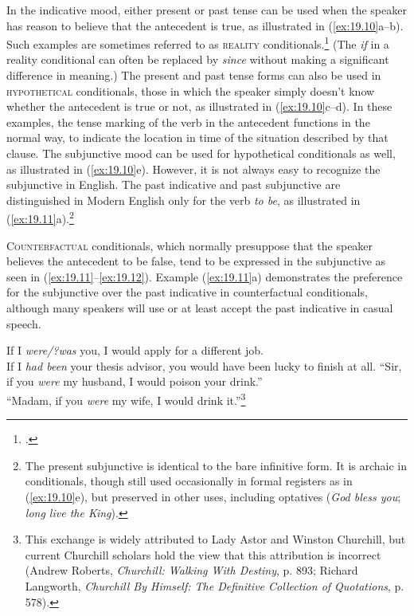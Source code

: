 In the indicative mood, either present or past tense can be used when the speaker has reason to believe that the antecedent is true, as illustrated in (\ref{ex:19.10}a--b). Such examples are sometimes referred to as \textsc{reality} conditionals.\footnote{\citet{ThompsonEtAl2007}.} (The \textit{if} in a reality conditional can often be replaced by \textit{since} without making a significant difference in meaning.) The present and past tense forms can also be used in \textsc{hypothetical} conditionals, those in which the speaker simply doesn’t know whether the antecedent is true or not, as illustrated in (\ref{ex:19.10}c--d). In these examples, the tense marking of the verb in the antecedent functions in the normal way, to indicate the location in time of the situation described by that clause. The subjunctive mood can be used for hypothetical conditionals as well, as illustrated in (\ref{ex:19.10}e). However, it is not always easy to recognize the subjunctive in English. The past indicative and past subjunctive are distinguished in Modern English only for the verb \textit{to be}, as illustrated in (\ref{ex:19.11}a).\footnote{The present subjunctive is identical to the bare infinitive form. It is archaic in conditionals, though still used occasionally in formal registers as in (\ref{ex:19.10}e), but preserved in other uses, including optatives (\textit{God bless you}; \textit{long live the King}).}



\textsc{Counterfactual} conditionals, which normally presuppose that the speaker believes the antecedent to be false, tend to be expressed in the subjunctive as seen in (\ref{ex:19.11}--\ref{ex:19.12}). Example (\ref{ex:19.11}a) demonstrates the preference for the subjunctive over the past indicative in counterfactual conditionals, although many speakers will use or at least accept the past indicative in casual speech.\largerpage[-1.5]


\ea \label{ex:19.11}
\ea  If I \textit{were/?was} you, I would apply for a different job.\\
\ex If I \textit{had been} your thesis advisor, you would have been lucky to finish at all.
\z\pagebreak
\ex \label{ex:19.12}
“Sir, if you \textit{were} my husband, I would poison your drink.”\\
“Madam, if you \textit{were} my wife, I would drink it.”\footnote{This exchange is widely attributed to Lady Astor and Winston Churchill, but current Churchill scholars hold the view that this attribution is incorrect (Andrew Roberts, \textit{Churchill: Walking With Destiny}, p. 893; Richard Langworth, \textit{Churchill By Himself: The Definitive Collection of Quotations}, p. 578).}
\z


